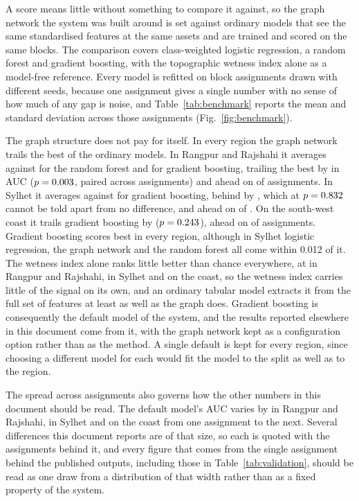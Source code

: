 \documentclass[10pt,a4paper,twocolumn]{article}
\begin{document}
A score means little without something to compare it against, so the graph network the system was built around is set against ordinary models that see the same standardised features at the same assets and are trained and scored on the same blocks. The comparison covers class-weighted logistic regression, a random forest and gradient boosting, with the topographic wetness index alone as a model-free reference. Every model is refitted on \RRBenchSeeds{} block assignments drawn with different seeds, because one assignment gives a single number with no sense of how much of any gap is noise, and Table~\ref{tab:benchmark} reports the mean and standard deviation across those assignments (Fig.~\ref{fig:benchmark}).

The graph structure does not pay for itself. In every region the graph network trails the best of the ordinary models. In Rangpur and Rajshahi it averages \RRBenchGraphAUC{} against \RRBenchForestAUC{} for the random forest and \RRBenchBoostingAUC{} for gradient boosting, trailing the best by \RRBenchGap{} in AUC ($p=0.003{}$, paired across assignments) and ahead on \RRBenchAhead{} of \RRBenchSeeds{} assignments. In Sylhet it averages \SylhetBenchGraphAUC{} against \SylhetBenchBoostingAUC{} for gradient boosting, behind by \SylhetBenchGap{}, which at $p=0.832{}$ cannot be told apart from no difference, and ahead on \SylhetBenchAhead{} of \SylhetBenchSeeds{}. On the south-west coast it trails gradient boosting by \CoastalBenchGap{} ($p=0.243{}$), ahead on \CoastalBenchAhead{} of \CoastalBenchSeeds{} assignments. Gradient boosting scores best in every region, although in Sylhet logistic regression, the graph network and the random forest all come within 0.012 of it. The wetness index alone ranks little better than chance everywhere, at \RRBenchTwiAUC{} in Rangpur and Rajshahi, \SylhetBenchTwiAUC{} in Sylhet and \CoastalBenchTwiAUC{} on the coast, so the wetness index carries little of the signal on its own, and an ordinary tabular model extracts it from the full set of features at least as well as the graph does. Gradient boosting is consequently the default model of the system, and the results reported elsewhere in this document come from it, with the graph network kept as a configuration option rather than as the method. A single default is kept for every region, since choosing a different model for each would fit the model to the split as well as to the region.

The spread across assignments also governs how the other numbers in this document should be read. The default model's AUC varies by \RRBenchBoostingSD{} in Rangpur and Rajshahi, \SylhetBenchBoostingSD{} in Sylhet and \CoastalBenchBoostingSD{} on the coast from one assignment to the next. Several differences this document reports are of that size, so each is quoted with the assignments behind it, and every figure that comes from the single assignment behind the published outputs, including those in Table~\ref{tab:validation}, should be read as one draw from a distribution of that width rather than as a fixed property of the system.
\end{document}
